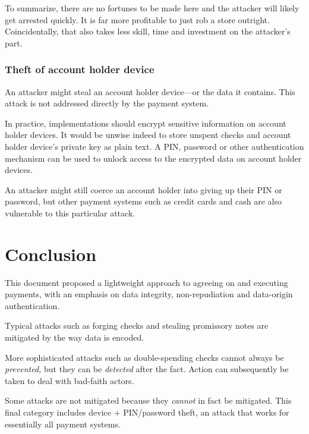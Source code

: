 \documentclass[12pt,a4paper]{article}
\begin{document}
\begin{multicols}{2}
	To summarize, there are no fortunes to be made here and the attacker will likely get arrested quickly. It is far more profitable to just rob a store outright. Coincidentally, that also takes less skill, time and investment on the attacker's part.

	\subsubsection{Theft of account holder device}

	An attacker might steal an account holder device---or the data it contains. This attack is not addressed directly by the payment system.

	In practice, implementations should encrypt sensitive information on account holder devices. It would be unwise indeed to store unspent checks and account holder device's private key as plain text. A PIN, password or other authentication mechanism can be used to unlock access to the encrypted data on account holder devices.

	An attacker might still coerce an account holder into giving up their PIN or password, but other payment systems such as credit cards and cash are also vulnerable to this particular attack.

	\section{Conclusion}

	This document proposed a lightweight approach to agreeing on and executing payments, with an emphasis on data integrity, non-repudiation and data-origin authentication.
	
	Typical attacks such as forging checks and stealing promissory notes are mitigated by the way data is encoded.

	More sophisticated attacks such as double-spending checks cannot always be \emph{prevented,} but they can be \emph{detected} after the fact. Action can subsequently be taken to deal with bad-faith actors.

	Some attacks are not mitigated because they \emph{cannot} in fact be mitigated. This final category includes device + PIN/password theft, an attack that works for essentially all payment systems.

	
	 

	\end{multicols}
\end{document}
